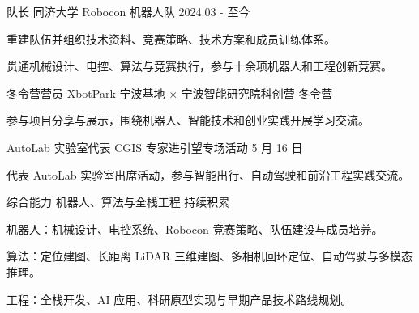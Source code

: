 \begin{cventries}

  \cventry
    {队长}
    {同济大学 Robocon 机器人队}
    {}
    {2024.03 - 至今}
    {
      \begin{cvitems}
        \item {重建队伍并组织技术资料、竞赛策略、技术方案和成员训练体系。}
        \item {贯通机械设计、电控、算法与竞赛执行，参与十余项机器人和工程创新竞赛。}
      \end{cvitems}
    }

  \cventry
    {冬令营营员}
    {XbotPark 宁波基地 × 宁波智能研究院科创营}
    {}
    {冬令营}
    {
      \begin{cvitems}
        \item {参与项目分享与展示，围绕机器人、智能技术和创业实践开展学习交流。}
      \end{cvitems}
    }

  \cventry
    {AutoLab 实验室代表}
    {CGIS 专家进引望专场活动}
    {}
    {5 月 16 日}
    {
      \begin{cvitems}
        \item {代表 AutoLab 实验室出席活动，参与智能出行、自动驾驶和前沿工程实践交流。}
      \end{cvitems}
    }

  \cventry
    {综合能力}
    {机器人、算法与全栈工程}
    {}
    {持续积累}
    {
      \begin{cvitems}
        \item {机器人：机械设计、电控系统、Robocon 竞赛策略、队伍建设与成员培养。}
        \item {算法：定位建图、长距离 LiDAR 三维建图、多相机回环定位、自动驾驶与多模态推理。}
        \item {工程：全栈开发、AI 应用、科研原型实现与早期产品技术路线规划。}
      \end{cvitems}
    }

\end{cventries}
\endgroup
